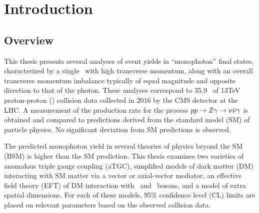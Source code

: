 \documentclass[oneside, letterpaper, 12pt, oldfontcommands]{memoir}
\begin{document}
\mainmatter

\chapter{Introduction} \label{chap:introduction}
\section{Overview} \label{sec:introduction_overview}
This thesis presents several analyses of event
yields in ``monophoton'' final states, characterized by a single \Pgamma\ with high transverse
momentum, along with an overall transverse momentum imbalance typically of equal magnitude and opposite direction to
that of the photon.
These analyses correspond to 35.9 \fbinv\ of 13\unit{TeV} proton-proton (\Pp\Pp) collision data collected in 2016 by the CMS
detector at the LHC. A measurement of the production rate for the process $pp \to Z\gamma \to \nu\bar{\nu}\gamma$ is obtained
and compared to predictions derived from the standard model (SM) of particle physics. No significant deviation from SM
predictions is observed.

The predicted monophoton yield in several theories of physics beyond the SM (BSM) is higher than the SM prediction.
This thesis examines two varieties of anomalous triple gauge coupling (aTGC), simplified models of dark matter (DM)
interacting with SM matter via a vector or axial-vector mediator, an effective field theory (EFT) of DM interaction
with  \Pgamma\ and \PZ\ bosons, and a model of extra spatial dimensions. For each of these models, 95\% confidence level (CL)
limits are placed on relevant parameters based on the observed collision data.
\end{document}
